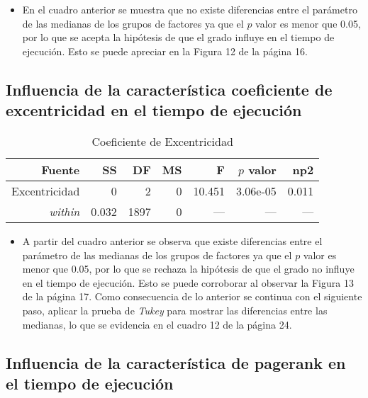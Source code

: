 \documentclass{article}
\begin{document}
\begin{itemize}
  \item En el cuadro anterior se muestra que no existe diferencias entre el parámetro de las medianas de los grupos de factores ya que el $p$ valor es menor que 0.05, por lo que se acepta la hipótesis de que el grado influye en el tiempo de ejecución. Esto se puede apreciar en la Figura 12 de la página 16.   
\end{itemize}

\subsection{Influencia de la característica coeficiente de excentricidad en el tiempo de ejecución} 

\begin{table}[H]
\caption{{\small Coeficiente de Excentricidad}}
\begin{center}		
	\centering
		\begin{tabular}{rrrrrrr}		
			\hline
			\textbf{Fuente} & \textbf{SS} & \textbf{DF} & \textbf{MS}& \textbf{F}& \textbf{$p$ valor} & \textbf{np2}\\
			
			\hline
			 Excentricidad & 0  & 2 & 0  & 10.451 & 3.06e-05 & 0.011 \\
			 \textit{within}    & 0.032 & 1897 & 0  & --- & --- & --- \\			 			 
			\hline
		\end{tabular}
		\label{cual}
	\label{tab:una-tablita}
\end{center}	
\end{table}

\begin{itemize}
  \item A partir del cuadro anterior se observa que existe diferencias entre el parámetro de las medianas de los grupos de factores ya que el $p$ valor es menor que 0.05, por lo que se rechaza la hipótesis de que el grado no influye en el tiempo de ejecución. Esto se puede corroborar al observar la Figura 13 de la página 17. Como consecuencia de lo anterior se continua con el siguiente paso,  aplicar la prueba de \textit{Tukey} para mostrar las diferencias entre las medianas, lo que se evidencia en el cuadro 12 de la página 24.   
\end{itemize}

\subsection{Influencia de la característica de pagerank en el tiempo de ejecución} 
\end{document}
